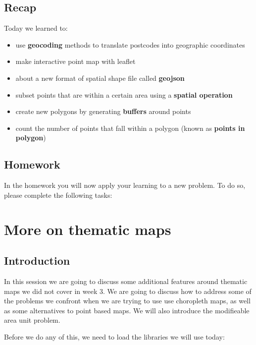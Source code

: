 \documentclass[]{book}
\providecommand{\tightlist}{%
  \setlength{\itemsep}{0pt}\setlength{\parskip}{0pt}}
\begin{document}
\hypertarget{recap}{%
\section{Recap}\label{recap}}

Today we learned to:

\begin{itemize}
\tightlist
\item
  use \textbf{geocoding} methods to translate postcodes into geographic coordinates
\item
  make interactive point map with leaflet
\item
  about a new format of spatial shape file called \textbf{geojson}
\item
  subset points that are within a certain area using a \textbf{spatial operation}
\item
  create new polygons by generating \textbf{buffers} around points
\item
  count the number of points that fall within a polygon (known as \textbf{points in polygon})
\end{itemize}

\hypertarget{homework}{%
\section{Homework}\label{homework}}

In the homework you will now apply your learning to a new problem. To do so, please complete the following tasks:

\hypertarget{more-on-thematic-maps}{%
\chapter{More on thematic maps}\label{more-on-thematic-maps}}

\hypertarget{introduction-1}{%
\section{Introduction}\label{introduction-1}}

In this session we are going to discuss some additional features around thematic maps we did not cover in week 3. We are going to discuss how to address some of the problems we confront when we are trying to use use choropleth maps, as well as some alternatives to point based maps. We will also introduce the modifieable area unit problem.

Before we do any of this, we need to load the libraries we will use today:
\end{document}
